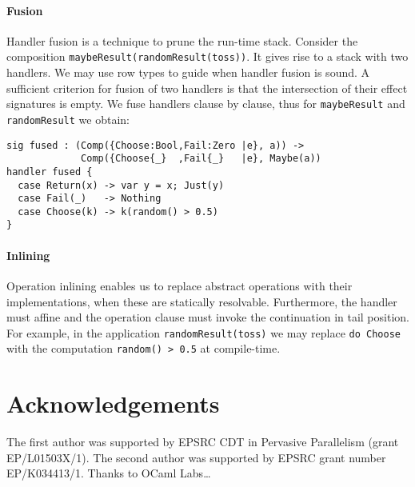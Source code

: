 \documentclass[preprint,numbers]{sigplanconf}
\begin{document}
\paragraph{Fusion} Handler fusion is a technique to prune the run-time
stack. Consider the composition
\lstinline$maybeResult(randomResult(toss))$. It gives
rise to a stack with two handlers.  We may use row types to guide when
handler fusion is sound. A sufficient criterion for fusion of two
handlers is that the intersection of their effect signatures is
empty. We fuse handlers clause by clause, thus for
\lstinline$maybeResult$ and \lstinline$randomResult$ we obtain:
\begin{lstlisting}
sig fused : (Comp({Choose:Bool,Fail:Zero |e}, a)) ->
             Comp({Choose{_}  ,Fail{_}   |e}, Maybe(a))
handler fused {
  case Return(x) -> var y = x; Just(y)
  case Fail(_)   -> Nothing
  case Choose(k) -> k(random() > 0.5)
}
\end{lstlisting}

\paragraph{Inlining} Operation inlining enables us to replace abstract
operations with their implementations, when these are statically
resolvable. Furthermore, the handler must affine and the operation
clause must invoke the continuation in tail position. For example, in
the application \lstinline$randomResult(toss)$ we may replace
\lstinline$do Choose$ with the computation \lstinline$random() > 0.5$ at compile-time.

\section{Acknowledgements}
The first author was supported by EPSRC CDT in Pervasive Parallelism
(grant EP/L01503X/1).  The second author was supported by EPSRC grant
number EP/K034413/1.  Thanks to OCaml Labs\dots

 \softraggedright

\end{document}
